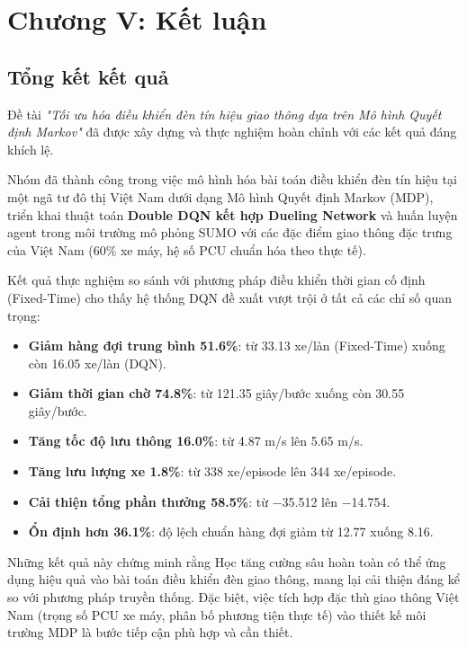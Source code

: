 \section{Chương V: Kết luận}

\subsection{Tổng kết kết quả}

Đề tài \textit{"Tối ưu hóa điều khiển đèn tín hiệu giao thông dựa trên Mô hình Quyết định Markov"} đã được xây dựng và thực nghiệm hoàn chỉnh với các kết quả đáng khích lệ.

Nhóm đã thành công trong việc mô hình hóa bài toán điều khiển đèn tín hiệu tại một ngã tư đô thị Việt Nam dưới dạng Mô hình Quyết định Markov (MDP), triển khai thuật toán \textbf{Double DQN kết hợp Dueling Network} và huấn luyện agent trong môi trường mô phỏng SUMO với các đặc điểm giao thông đặc trưng của Việt Nam (60\% xe máy, hệ số PCU chuẩn hóa theo thực tế).

Kết quả thực nghiệm so sánh với phương pháp điều khiển thời gian cố định (Fixed-Time) cho thấy hệ thống DQN đề xuất vượt trội ở tất cả các chỉ số quan trọng:

\begin{itemize}
    \item \textbf{Giảm hàng đợi trung bình 51.6\%}: từ 33.13 xe/làn (Fixed-Time) xuống còn 16.05 xe/làn (DQN).
    \item \textbf{Giảm thời gian chờ 74.8\%}: từ 121.35 giây/bước xuống còn 30.55 giây/bước.
    \item \textbf{Tăng tốc độ lưu thông 16.0\%}: từ 4.87 m/s lên 5.65 m/s.
    \item \textbf{Tăng lưu lượng xe 1.8\%}: từ 338 xe/episode lên 344 xe/episode.
    \item \textbf{Cải thiện tổng phần thưởng 58.5\%}: từ $-$35.512 lên $-$14.754.
    \item \textbf{Ổn định hơn 36.1\%}: độ lệch chuẩn hàng đợi giảm từ 12.77 xuống 8.16.
\end{itemize}

Những kết quả này chứng minh rằng Học tăng cường sâu hoàn toàn có thể ứng dụng hiệu quả vào bài toán điều khiển đèn giao thông, mang lại cải thiện đáng kể so với phương pháp truyền thống. Đặc biệt, việc tích hợp đặc thù giao thông Việt Nam (trọng số PCU xe máy, phân bố phương tiện thực tế) vào thiết kế môi trường MDP là bước tiếp cận phù hợp và cần thiết.

